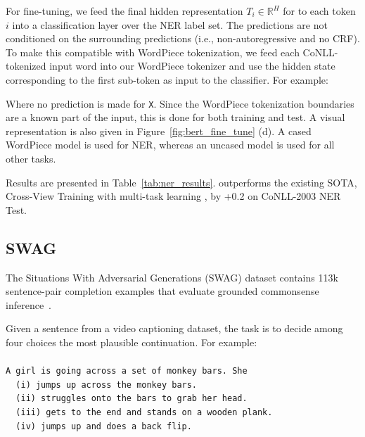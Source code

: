 For fine-tuning, we feed the final hidden representation $T_i \in \mathbb{R}^H$ for to each token $i$ into a classification layer over the NER label set. The predictions are not conditioned on the surrounding predictions (i.e., non-autoregressive and no CRF). To make this compatible with WordPiece tokenization, we feed each CoNLL-tokenized input word into our WordPiece tokenizer and use the hidden state corresponding to the first sub-token as input to the classifier. For example:
\linebreak
\linebreak
{}
\linebreak
\linebreak

Where no prediction is made for {\tt X}. Since the WordPiece tokenization boundaries are a known part of the input, this is done for both training and test. A visual representation is also given in Figure~\ref{fig:bert_fine_tune} (d). A cased WordPiece model is used for NER, whereas an uncased model is used for all other tasks.

Results are presented in Table~\ref{tab:ner_results}. \bertlarge outperforms the existing SOTA, Cross-View Training with multi-task learning \cite{clark2018semi}, by +0.2 on CoNLL-2003 NER Test.


\subsection{SWAG}
\label{sec:swag}
The Situations With Adversarial Generations (SWAG) dataset contains 113k sentence-pair completion examples that evaluate grounded commonsense inference~\cite{zellers2018swag}.

Given a sentence from a video captioning dataset, the task is to decide among four choices the most plausible continuation. For example:\\
\\
{\tt {\scriptsize A girl is going across a set of monkey bars. She}}\\
{\tt {\scriptsize  ~~(i) jumps up across the monkey bars. \\
                   ~~(ii) struggles onto the bars to grab her head. \\
                   ~~(iii) gets to the end and stands on a wooden plank. \\
                   ~~(iv) jumps up and does a back flip.}}\\

